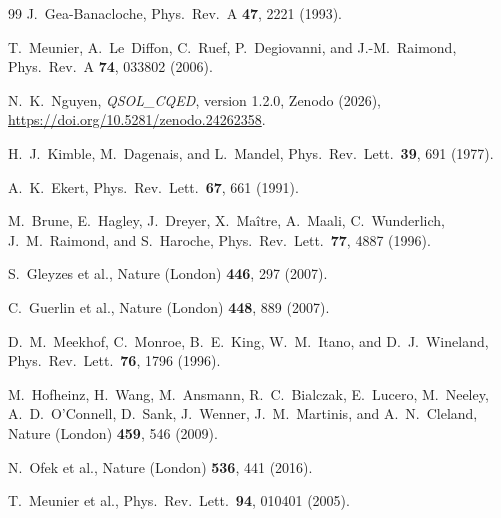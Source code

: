 \documentclass[%
 reprint,
 amsmath,amssymb,
 aps,
 floatfix,
]{revtex4-2}
\begin{document}
\begin{thebibliography}{99}
J.~Gea-Banacloche, Phys.\ Rev.\ A \textbf{47}, 2221 (1993).

T.~Meunier, A.~Le~Diffon, C.~Ruef, P.~Degiovanni, and J.-M.~Raimond, Phys.\ Rev.\ A \textbf{74}, 033802 (2006).

N.~K.~Nguyen, \textit{QSOL\_CQED}, version 1.2.0, Zenodo (2026), \url{https://doi.org/10.5281/zenodo.24262358}.

H.~J.~Kimble, M.~Dagenais, and L.~Mandel, Phys.\ Rev.\ Lett.\ \textbf{39}, 691 (1977).

A.~K.~Ekert, Phys.\ Rev.\ Lett.\ \textbf{67}, 661 (1991).

M.~Brune, E.~Hagley, J.~Dreyer, X.~Ma\^{i}tre, A.~Maali, C.~Wunderlich, J.~M.~Raimond, and S.~Haroche, Phys.\ Rev.\ Lett.\ \textbf{77}, 4887 (1996).

S.~Gleyzes et al., Nature (London) \textbf{446}, 297 (2007).

C.~Guerlin et al., Nature (London) \textbf{448}, 889 (2007).

D.~M.~Meekhof, C.~Monroe, B.~E.~King, W.~M.~Itano, and D.~J.~Wineland, Phys.\ Rev.\ Lett.\ \textbf{76}, 1796 (1996).

M.~Hofheinz, H.~Wang, M.~Ansmann, R.~C.~Bialczak, E.~Lucero, M.~Neeley, A.~D.~O'Connell, D.~Sank, J.~Wenner, J.~M.~Martinis, and A.~N.~Cleland, Nature (London) \textbf{459}, 546 (2009).

N.~Ofek et al., Nature (London) \textbf{536}, 441 (2016).

T.~Meunier et al., Phys.\ Rev.\ Lett.\ \textbf{94}, 010401 (2005).

\end{thebibliography}
\end{document}
